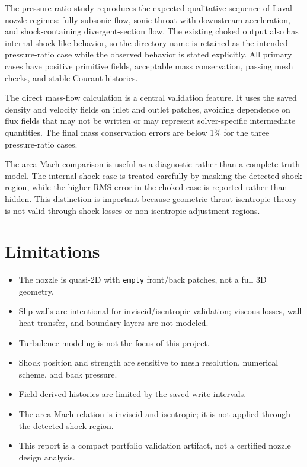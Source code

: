 \documentclass[11pt,a4paper]{article}
\begin{document}
The pressure-ratio study reproduces the expected qualitative sequence of Laval-nozzle regimes: fully subsonic flow, sonic throat with downstream acceleration, and shock-containing divergent-section flow. The existing choked output also has internal-shock-like behavior, so the directory name is retained as the intended pressure-ratio case while the observed behavior is stated explicitly. All primary cases have positive primitive fields, acceptable mass conservation, passing mesh checks, and stable Courant histories.

The direct mass-flow calculation is a central validation feature. It uses the saved density and velocity fields on inlet and outlet patches, avoiding dependence on flux fields that may not be written or may represent solver-specific intermediate quantities. The final mass conservation errors are below 1\% for the three pressure-ratio cases.

The area-Mach comparison is useful as a diagnostic rather than a complete truth model. The internal-shock case is treated carefully by masking the detected shock region, while the higher RMS error in the choked case is reported rather than hidden. This distinction is important because geometric-throat isentropic theory is not valid through shock losses or non-isentropic adjustment regions.

\section{Limitations}

\begin{itemize}
\item The nozzle is quasi-2D with \texttt{empty} front/back patches, not a full 3D geometry.
\item Slip walls are intentional for inviscid/isentropic validation; viscous losses, wall heat transfer, and boundary layers are not modeled.
\item Turbulence modeling is not the focus of this project.
\item Shock position and strength are sensitive to mesh resolution, numerical scheme, and back pressure.
\item Field-derived histories are limited by the saved write intervals.
\item The area-Mach relation is inviscid and isentropic; it is not applied through the detected shock region.
\item This report is a compact portfolio validation artifact, not a certified nozzle design analysis.
\end{itemize}
\end{document}

